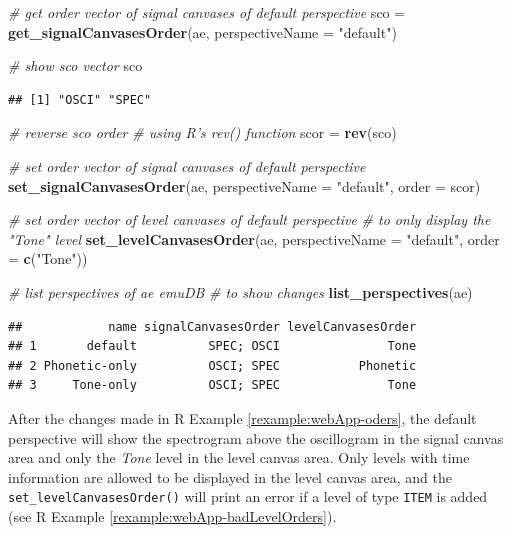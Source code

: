 \documentclass[]{book}
\newenvironment{Shaded}{\begin{snugshade}}{\end{snugshade}}
\newcommand{\CommentTok}[1]{\textcolor[rgb]{0.56,0.35,0.01}{\textit{#1}}}
\newcommand{\DataTypeTok}[1]{\textcolor[rgb]{0.13,0.29,0.53}{#1}}
\newcommand{\KeywordTok}[1]{\textcolor[rgb]{0.13,0.29,0.53}{\textbf{#1}}}
\newcommand{\NormalTok}[1]{#1}
\newcommand{\StringTok}[1]{\textcolor[rgb]{0.31,0.60,0.02}{#1}}
\theoremstyle{definition}
\theoremstyle{definition}
\theoremstyle{definition}
\theoremstyle{remark}
\begin{document}
\begin{Shaded}
\begin{Highlighting}[]
\CommentTok{# get order vector of signal canvases of default perspective}
\NormalTok{sco =}\StringTok{ }\KeywordTok{get_signalCanvasesOrder}\NormalTok{(ae,}
                              \DataTypeTok{perspectiveName =} \StringTok{"default"}\NormalTok{)}

\CommentTok{# show sco vector}
\NormalTok{sco}
\end{Highlighting}
\end{Shaded}

\begin{verbatim}
## [1] "OSCI" "SPEC"
\end{verbatim}

\begin{Shaded}
\begin{Highlighting}[]
\CommentTok{# reverse sco order}
\CommentTok{# using R's rev() function}
\NormalTok{scor =}\StringTok{ }\KeywordTok{rev}\NormalTok{(sco)}

\CommentTok{# set order vector of signal canvases of default perspective}
\KeywordTok{set_signalCanvasesOrder}\NormalTok{(ae,}
                        \DataTypeTok{perspectiveName =} \StringTok{"default"}\NormalTok{,}
                        \DataTypeTok{order =}\NormalTok{ scor)}

\CommentTok{# set order vector of level canvases of default perspective}
\CommentTok{# to only display the "Tone" level}
\KeywordTok{set_levelCanvasesOrder}\NormalTok{(ae,}
                       \DataTypeTok{perspectiveName =} \StringTok{"default"}\NormalTok{,}
                       \DataTypeTok{order =} \KeywordTok{c}\NormalTok{(}\StringTok{"Tone"}\NormalTok{))}

\CommentTok{# list perspectives of ae emuDB}
\CommentTok{# to show changes}
\KeywordTok{list_perspectives}\NormalTok{(ae)}
\end{Highlighting}
\end{Shaded}

\begin{verbatim}
##            name signalCanvasesOrder levelCanvasesOrder
## 1       default          SPEC; OSCI               Tone
## 2 Phonetic-only          OSCI; SPEC           Phonetic
## 3     Tone-only          OSCI; SPEC               Tone
\end{verbatim}

After the changes made in R Example \ref{rexample:webApp-oders}, the
default perspective will show the spectrogram above the oscillogram in
the signal canvas area and only the \emph{Tone} level in the level
canvas area. Only levels with time information are allowed to be
displayed in the level canvas area, and the
\texttt{set\_levelCanvasesOrder()} will print an error if a level of
type \texttt{ITEM} is added (see R Example
\ref{rexample:webApp-badLevelOrders}).
\end{document}
